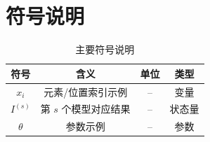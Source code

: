 \section{符号说明}
\begin{table}[H]
    \centering
    \caption{主要符号说明}
    \label{tab:symbols}
    \begin{tabular}{cccc}
        \toprule
        符号 & 含义 & 单位 & 类型 \\
        \midrule
        $x_i$ & 元素/位置索引示例 & -- & 变量 \\
        $I^{(s)}$ & 第 $s$ 个模型对应结果 & -- & 状态量 \\
        $\theta$ & 参数示例 & -- & 参数 \\
        \bottomrule
    \end{tabular}
\end{table}

